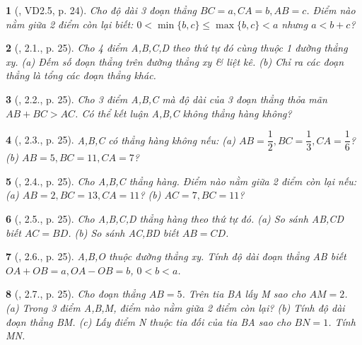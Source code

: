\documentclass{article}
\newtheorem{baitoan}{}
\begin{document}
\begin{baitoan}[\cite{TLCT_THCS_Toan_6_hinh_hoc}, VD2.5, p. 24]
	Cho độ dài 3 đoạn thẳng $BC = a,CA = b,AB = c$. Điểm nào nằm giữa 2 điểm còn lại biết: $0 < \min\{b,c\}\le\max\{b,c\} < a$ nhưng $a < b + c$?
\end{baitoan}

\begin{baitoan}[\cite{TLCT_THCS_Toan_6_hinh_hoc}, 2.1., p. 25]
	Cho 4 điểm A,B,C,D theo thứ tự đó cùng thuộc 1 đường thẳng xy. (a) Đếm số đoạn thẳng trên đường thẳng xy \& liệt kê. (b) Chỉ ra các đoạn thẳng là tổng các đoạn thẳng khác.
\end{baitoan}

\begin{baitoan}[\cite{TLCT_THCS_Toan_6_hinh_hoc}, 2.2., p. 25]
	Cho 3 điểm A,B,C mà độ dài của 3 đoạn thẳng thỏa mãn $AB + BC > AC$. Có thể kết luận A,B,C không thẳng hàng không?
\end{baitoan}

\begin{baitoan}[\cite{TLCT_THCS_Toan_6_hinh_hoc}, 2.3., p. 25]
	A,B,C có thẳng hàng không nếu: (a) $AB = \dfrac{1}{2},BC = \dfrac{1}{3},CA = \dfrac{1}{6}$? (b) $AB = 5,BC = 11,CA = 7$?
\end{baitoan}

\begin{baitoan}[\cite{TLCT_THCS_Toan_6_hinh_hoc}, 2.4., p. 25]
	Cho A,B,C thẳng hàng. Điểm nào nằm giữa 2 điểm còn lại nếu: (a) $AB = 2,BC = 13,CA = 11$? (b) $AC = 7,BC = 11$?
\end{baitoan}

\begin{baitoan}[\cite{TLCT_THCS_Toan_6_hinh_hoc}, 2.5., p. 25]
	Cho A,B,C,D thẳng hàng theo thứ tự đó. (a) So sánh AB,CD biết $AC = BD$. (b) So sánh AC,BD biết $AB = CD$.
\end{baitoan}

\begin{baitoan}[\cite{TLCT_THCS_Toan_6_hinh_hoc}, 2.6., p. 25]
	A,B,O thuộc đường thẳng xy. Tính độ dài đoạn thẳng AB biết $OA + OB = a,OA - OB = b$, $0 < b < a$.
\end{baitoan}

\begin{baitoan}[\cite{TLCT_THCS_Toan_6_hinh_hoc}, 2.7., p. 25]
	Cho đoạn thẳng $AB = 5$. Trên tia BA lấy M sao cho $AM = 2$. (a) Trong 3 điểm A,B,M, điểm nào nằm giữa 2 điểm còn lại? (b) Tính độ dài đoạn thẳng BM. (c) Lấy điểm N thuộc tia đối của tia BA sao cho $BN = 1$. Tính MN.
\end{baitoan}
\end{document}
